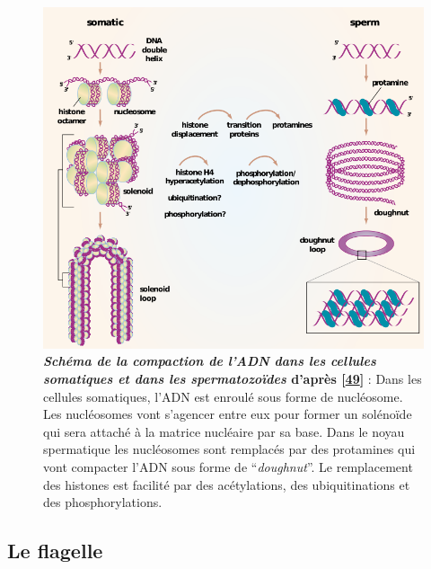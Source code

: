 \documentclass[12pt,a4paper,twoside]{ugathesis}
\theoremstyle{definition}
\theoremstyle{definition}
\theoremstyle{definition}
\theoremstyle{remark}
\begin{document}
\newpage

\begin{figure}

{\centering \includegraphics[scale=.55]{figure/noyau} 

}

\caption[Schéma de la compaction de l’ADN dans les cellules somatiques et dans les spermatozoïdes]{\textbf{\emph{Schéma de la compaction de l'ADN dans les
cellules somatiques et dans les spermatozoïdes} d'après
{[}\protect\hyperlink{ref-Braun2001}{49}{]}} : Dans les cellules
somatiques, l'ADN est enroulé sous forme de nucléosome. Les nucléosomes
vont s'agencer entre eux pour former un solénoïde qui sera attaché à la
matrice nucléaire par sa base. Dans le noyau spermatique les nucléosomes
sont remplacés par des protamines qui vont compacter l'ADN sous forme de
``\emph{doughnut}''. Le remplacement des histones est facilité par des
acétylations, des ubiquitinations et des phosphorylations.}\label{fig:noyau}
\end{figure}











\newpage

\subsection{Le flagelle}\label{le-flagelle}
\end{document}
